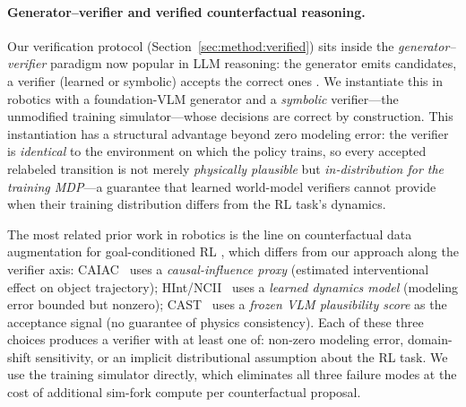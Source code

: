 \documentclass{article}
\begin{document}
\paragraph{Generator--verifier and verified counterfactual reasoning.}
Our verification protocol (Section~\ref{sec:method:verified}) sits inside the
\emph{generator--verifier} paradigm now popular in LLM reasoning: the
generator emits candidates, a verifier (learned or symbolic) accepts the
correct ones \citep{zha2025tango}. We instantiate this in robotics with a
foundation-VLM generator and a \emph{symbolic} verifier---the unmodified
training simulator---whose decisions are correct by construction.
This instantiation has a structural advantage beyond zero modeling error:
the verifier is \emph{identical} to the environment on which the policy
trains, so every accepted relabeled transition is not merely \emph{physically
plausible} but \emph{in-distribution for the training MDP}---a guarantee that
learned world-model verifiers \citep{wu2025rlvrworld} cannot provide when
their training distribution differs from the RL task's dynamics.

The most related prior work in robotics is the line on counterfactual data
augmentation for goal-conditioned RL \citep{urpi2024caiac,chuck2025hint,glossop2025cast},
which differs from our approach along the verifier axis:
CAIAC~\citep{urpi2024caiac} uses a \emph{causal-influence proxy} (estimated
interventional effect on object trajectory);
HInt/NCII~\citep{chuck2025hint} uses a \emph{learned dynamics model}
(modeling error bounded but nonzero);
CAST~\citep{glossop2025cast} uses a \emph{frozen VLM plausibility score} as
the acceptance signal (no guarantee of physics consistency).
Each of these three choices produces a verifier with at least one of:
non-zero modeling error, domain-shift sensitivity, or an implicit distributional
assumption about the RL task. We use the training simulator directly,
which eliminates all three failure modes at the cost of additional
sim-fork compute per counterfactual proposal.
\end{document}
